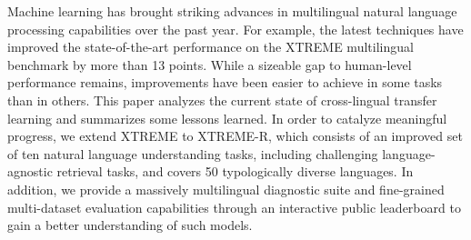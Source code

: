 Machine learning has brought striking advances in multilingual natural language processing capabilities over the past year. For example, the latest techniques have improved the state-of-the-art performance on the XTREME multilingual benchmark by more than 13 points. While a sizeable gap to human-level performance remains, improvements have been easier to achieve in some tasks than in others. This paper analyzes the current state of cross-lingual transfer learning and summarizes some lessons learned. In order to catalyze meaningful progress, we extend XTREME to XTREME-R, which consists of an improved set of ten natural language understanding tasks, including challenging language-agnostic retrieval tasks, and covers 50 typologically diverse languages. In addition, we provide a massively multilingual diagnostic suite and fine-grained multi-dataset evaluation capabilities through an interactive public leaderboard to gain a better understanding of such models.
